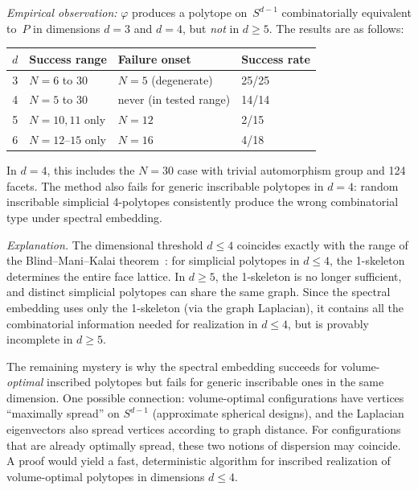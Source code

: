 \documentclass[11pt]{article}
\begin{document}
\begin{enumerate}
    \emph{Empirical observation:} $\varphi$ produces a polytope on~$S^{d-1}$
    combinatorially equivalent to~$P$ in dimensions $d = 3$ and $d = 4$,
    but \emph{not} in $d \geq 5$.  The results are as follows:
    \begin{center}
    \begin{tabular}{r l l l}
    \toprule
    $d$ & Success range & Failure onset & Success rate \\
    \midrule
    3 & $N = 6$ to $30$ & $N = 5$ (degenerate) & 25/25 \\
    4 & $N = 5$ to $30$ & never (in tested range) & 14/14 \\
    5 & $N = 10, 11$ only & $N = 12$ & 2/15 \\
    6 & $N = 12\text{--}15$ only & $N = 16$ & 4/18 \\
    \bottomrule
    \end{tabular}
    \end{center}
    In $d = 4$, this includes the $N = 30$ case with trivial
    automorphism group and 124 facets.  The method also fails for
    generic inscribable polytopes in $d = 4$: random inscribable
    simplicial 4-polytopes consistently produce the wrong
    combinatorial type under spectral embedding.

    \emph{Explanation.}  The dimensional threshold $d \leq 4$
    coincides exactly with the range of the
    Blind--Mani--Kalai theorem~\cite{Kalai1988}: for
    simplicial polytopes in $d \leq 4$, the 1-skeleton
    determines the entire face lattice.  In $d \geq 5$, the
    1-skeleton is no longer sufficient, and distinct
    simplicial polytopes can share the same graph.  Since the
    spectral embedding uses only the 1-skeleton (via the
    graph Laplacian), it contains all the combinatorial
    information needed for realization in $d \leq 4$, but
    is provably incomplete in $d \geq 5$.

    The remaining mystery is why the spectral embedding
    succeeds for volume-\emph{optimal} inscribed polytopes
    but fails for generic inscribable ones in the same
    dimension.  One possible connection: volume-optimal
    configurations have vertices ``maximally spread'' on
    $S^{d-1}$ (approximate spherical designs), and the
    Laplacian eigenvectors also spread vertices according to
    graph distance.  For configurations that are already
    optimally spread, these two notions of dispersion may
    coincide.  A proof would yield a fast, deterministic
    algorithm for inscribed realization of volume-optimal
    polytopes in dimensions $d \leq 4$.


\end{enumerate}
\end{document}
